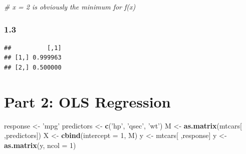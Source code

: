 \documentclass[]{article}
\newenvironment{Shaded}{\begin{snugshade}}{\end{snugshade}}
\newcommand{\KeywordTok}[1]{\textcolor[rgb]{0.13,0.29,0.53}{\textbf{#1}}}
\newcommand{\DataTypeTok}[1]{\textcolor[rgb]{0.13,0.29,0.53}{#1}}
\newcommand{\DecValTok}[1]{\textcolor[rgb]{0.00,0.00,0.81}{#1}}
\newcommand{\FloatTok}[1]{\textcolor[rgb]{0.00,0.00,0.81}{#1}}
\newcommand{\StringTok}[1]{\textcolor[rgb]{0.31,0.60,0.02}{#1}}
\newcommand{\CommentTok}[1]{\textcolor[rgb]{0.56,0.35,0.01}{\textit{#1}}}
\newcommand{\ControlFlowTok}[1]{\textcolor[rgb]{0.13,0.29,0.53}{\textbf{#1}}}
\newcommand{\OperatorTok}[1]{\textcolor[rgb]{0.81,0.36,0.00}{\textbf{#1}}}
\newcommand{\NormalTok}[1]{#1}
\begin{document}
\begin{Shaded}
\begin{Highlighting}[]
\CommentTok{# x = 2 is obviously the minimum for f(x)}
\end{Highlighting}
\end{Shaded}

\subsubsection*{1.3}

\begin{Shaded}
\end{Shaded}

\begin{verbatim}
##          [,1]
## [1,] 0.999963
## [2,] 0.500000
\end{verbatim}

\section*{Part 2: OLS Regression}

\begin{Shaded}
\begin{Highlighting}[]
\NormalTok{response <-}\StringTok{ 'mpg'}
\NormalTok{predictors <-}\StringTok{ }\KeywordTok{c}\NormalTok{(}\StringTok{'hp'}\NormalTok{, }\StringTok{'qsec'}\NormalTok{, }\StringTok{'wt'}\NormalTok{) }
\NormalTok{M <-}\StringTok{ }\KeywordTok{as.matrix}\NormalTok{(mtcars[ ,predictors]) }
\NormalTok{X <-}\StringTok{ }\KeywordTok{cbind}\NormalTok{(}\DataTypeTok{intercept =} \DecValTok{1}\NormalTok{, M)}
\NormalTok{y <-}\StringTok{ }\NormalTok{mtcars[ ,response]}
\NormalTok{y <-}\StringTok{ }\KeywordTok{as.matrix}\NormalTok{(y, }\DataTypeTok{ncol =} \DecValTok{1}\NormalTok{)}
\end{Highlighting}
\end{Shaded}
\end{document}
